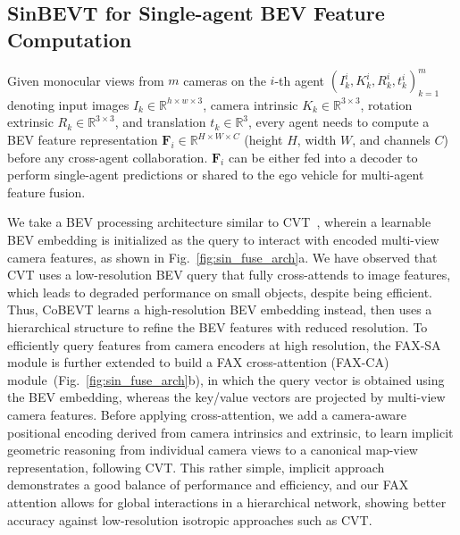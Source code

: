 \documentclass{article}
\begin{document}
\subsection{SinBEVT for Single-agent BEV Feature Computation}
\label{ssec:sinbevt}
%
Given monocular views from $m$ cameras on the $i$-th agent $(I_k^i, K_k^i, R_k^i, t_k^i)_{k=1}^m$ denoting input images $I_k \in  \mathbb{R}^{h \times w \times 3} $, camera intrinsic $K_k \in  \mathbb{R}^{3 \times 3}$, rotation extrinsic  $R_k \in  \mathbb{R}^{3 \times 3}$, and translation $t_k \in  \mathbb{R}^{3} $, every agent needs to compute a BEV feature representation $\mathbf{F}_i\in \mathbb{R}^{H \times W \times C}$ (height $H$, width $W$, and channels $C$) before any cross-agent collaboration.
%
$\mathbf{F}_i$ can be either fed into a decoder to perform single-agent predictions or shared to the ego vehicle for multi-agent feature fusion.

We take a BEV processing architecture similar to CVT~\cite{zhou2022cross}, wherein a learnable BEV embedding is initialized as the query to interact with encoded multi-view camera features, as shown in Fig.~\ref{fig:sin_fuse_arch}a. 
%
We have observed that CVT uses a low-resolution BEV query that fully cross-attends to image features, which leads to degraded performance on small objects, despite being efficient.
%
Thus, CoBEVT learns a high-resolution BEV embedding instead, then uses a hierarchical structure to refine the BEV features with reduced resolution.
%
To efficiently query features from camera encoders at high resolution, the FAX-SA module is further extended to build a FAX cross-attention (FAX-CA) module~(Fig.~\ref{fig:sin_fuse_arch}b), in which the query vector is obtained using the BEV embedding, whereas the key/value vectors are projected by multi-view camera features.
%
Before applying cross-attention, we add a camera-aware positional encoding derived from camera intrinsics and extrinsic, to learn implicit geometric reasoning from individual camera views to a canonical map-view representation, following CVT.
%
This rather simple, implicit approach demonstrates a good balance of performance and efficiency, and our FAX attention allows for global interactions in a hierarchical network, showing better accuracy against low-resolution isotropic approaches such as CVT.
\end{document}
